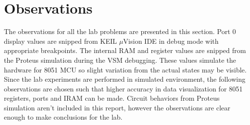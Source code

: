 \documentclass{lab_sheet}
\begin{document}
\section{Observations}
The observations for all the lab problems are presented in this section. Port 0 display values are snipped from KEIL $\mu$Vision IDE in debug mode with appropriate breakpoints. The internal RAM and register values are snipped from the Proteus simulation during the VSM debugging. These values simulate the hardware for 8051 MCU so slight variation from the actual states may be visible. Since the lab experiments are performed in simulated environment, the following observations are chosen such that higher accuracy in data visualization for 8051 registers, ports and IRAM can be made. Circuit behaviors from Proteus simulation aren't included in this report, however the observations are clear enough to make conclusions for the lab.
\end{document}
